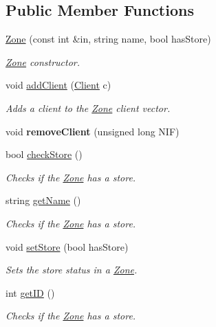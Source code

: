 \subsection*{Public Member Functions}
\begin{DoxyCompactItemize}
\item 
\hyperlink{classZone_a240ae395a9b19a9822667772f7fa3b28}{Zone} (const int \&in, string name, bool has\-Store)
\begin{DoxyCompactList}\small\item\em \hyperlink{classZone}{Zone} constructor. \end{DoxyCompactList}\item 
void \hyperlink{classZone_a2a3407fdaaaa3926be04cdf7294750ac}{add\-Client} (\hyperlink{classClient}{Client} c)
\begin{DoxyCompactList}\small\item\em Adds a client to the \hyperlink{classZone}{Zone} client vector. \end{DoxyCompactList}\item 
\hypertarget{classZone_a4af37f9d0b95ac5efd5930c5d3a237bf}{void {\bfseries remove\-Client} (unsigned long N\-I\-F)}\label{classZone_a4af37f9d0b95ac5efd5930c5d3a237bf}

\item 
bool \hyperlink{classZone_ac96cd131db38f2e28da929a7f7b0db00}{check\-Store} ()
\begin{DoxyCompactList}\small\item\em Checks if the \hyperlink{classZone}{Zone} has a store. \end{DoxyCompactList}\item 
string \hyperlink{classZone_a94bcfd6622d27041130bb1d56021e557}{get\-Name} ()
\begin{DoxyCompactList}\small\item\em Checks if the \hyperlink{classZone}{Zone} has a store. \end{DoxyCompactList}\item 
void \hyperlink{classZone_afffd33b4006d092866f9cd99d67070c4}{set\-Store} (bool has\-Store)
\begin{DoxyCompactList}\small\item\em Sets the store status in a \hyperlink{classZone}{Zone}. \end{DoxyCompactList}\item 
int \hyperlink{classZone_a40d5df046e49023ac0f9376c645573b2}{get\-I\-D} ()
\begin{DoxyCompactList}\small\item\em Checks if the \hyperlink{classZone}{Zone} has a store. \end{DoxyCompactList}\end{DoxyCompactItemize}
